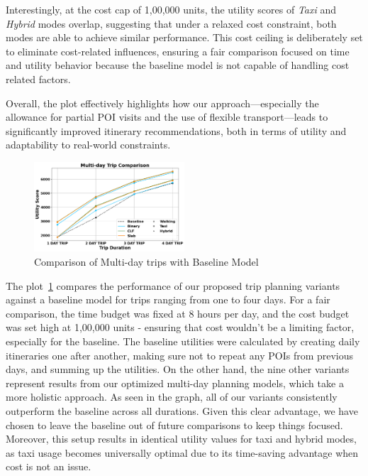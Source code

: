 Interestingly, at the cost cap of 1,00,000 units, the utility scores of \textit{Taxi} and \textit{Hybrid} modes overlap, suggesting that under a relaxed cost constraint, both modes are able to achieve similar performance. This cost ceiling is deliberately set to eliminate cost-related influences, ensuring a fair comparison focused on time and utility behavior because the baseline model is not capable of handling cost related factors.

Overall, the plot effectively highlights how our approach—especially the allowance for partial POI visits and the use of flexible transport—leads to significantly improved itinerary recommendations, both in terms of utility and adaptability to real-world constraints.



\begin{figure}[th]
\includegraphics[width=0.5\textwidth]{plots/baselineComparison_pkj.png}
\caption{Comparison of Multi-day trips with Baseline Model}
\label{fig:comparisonWithBaselinePlot}
\end{figure}

The plot~\ref{fig:comparisonWithBaselinePlot} compares the performance of our proposed trip planning variants against a baseline model for trips ranging from one to four days. For a fair comparison, the time budget was fixed at 8 hours per day, and the cost budget was set high at 1,00,000 units - ensuring that cost wouldn’t be a limiting factor, especially for the baseline. The baseline utilities were calculated by creating daily itineraries one after another, making sure not to repeat any POIs from previous days, and summing up the utilities. On the other hand, the nine other variants represent results from our optimized multi-day planning models, which take a more holistic approach. As seen in the graph, all of our variants consistently outperform the baseline across all durations. Given this clear advantage, we have chosen to leave the baseline out of future comparisons to keep things focused. Moreover, this setup results in identical utility values for taxi and hybrid modes, as taxi usage becomes universally optimal due to its time-saving advantage when cost is not an issue. \\

